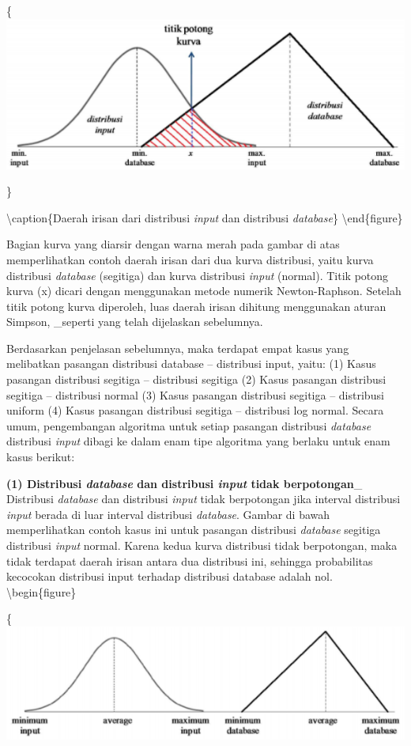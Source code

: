 \documentclass[
]{book}
\begin{document}
\{\centering \includegraphics[width=0.5\linewidth]{images/screening/irisan}

\}

\textbackslash caption\{Daerah irisan dari distribusi \emph{input} dan distribusi \emph{database}\}\label{fig:unnamed-chunk-32}
\textbackslash end\{figure\}

Bagian kurva yang diarsir dengan warna merah pada gambar di atas memperlihatkan contoh daerah irisan dari dua kurva distribusi, yaitu kurva distribusi \emph{database} (segitiga) dan kurva distribusi \emph{input} (normal). Titik potong kurva (x) dicari dengan menggunakan metode numerik Newton-Raphson. Setelah titik potong kurva diperoleh, luas daerah irisan dihitung menggunakan aturan Simpson, \_seperti yang telah dijelaskan sebelumnya.

Berdasarkan penjelasan sebelumnya, maka terdapat empat kasus yang melibatkan pasangan distribusi database -- distribusi input, yaitu:
(1) Kasus pasangan distribusi segitiga -- distribusi segitiga
(2) Kasus pasangan distribusi segitiga -- distribusi normal
(3) Kasus pasangan distribusi segitiga -- distribusi uniform
(4) Kasus pasangan distribusi segitiga -- distribusi log normal.
Secara umum, pengembangan algoritma untuk setiap pasangan distribusi \emph{database} distribusi \emph{input} dibagi ke dalam enam tipe algoritma yang berlaku untuk enam kasus berikut:

\textbf{(1) Distribusi \emph{database} dan distribusi \emph{input} tidak berpotongan}\_
Distribusi \emph{database} dan distribusi \emph{input} tidak berpotongan jika interval distribusi \emph{input} berada di luar interval distribusi \emph{database}. Gambar di bawah memperlihatkan contoh kasus ini untuk pasangan distribusi \emph{database} segitiga distribusi \emph{input} normal. Karena kedua kurva distribusi tidak berpotongan, maka tidak terdapat daerah irisan antara dua distribusi ini, sehingga probabilitas kecocokan distribusi input terhadap distribusi database adalah nol.
\textbackslash begin\{figure\}

\{\centering \includegraphics[width=0.5\linewidth]{images/screening/tidak_berpotongan}
\end{document}
